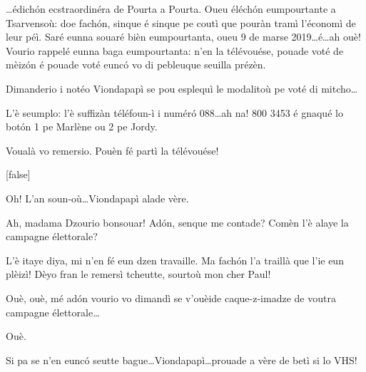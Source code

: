 \begin{drama}

\Brunospeaks \ldots édich\'on ecstraordinéra de Pourta a Pourta. Oueu éléch\'on eumpourtante a  Tsarvensoù: doe fach\'on, sinque é sinque pe coutì que pouràn tramì l'économì de leur péì. Saré eunna souaré bièn eumpourtanta, oueu 9 de marse 2019\ldots é\ldots ah ouè! Vourio rappelé eunna baga eumpourtanta: n'en la télévouése, pouade voté de mèiz\'on é pouade voté eunc\'o vo di pebleuque seuilla prézèn.


\Brunospeaks {} Dimanderio i notéo Viondapapì se pou esplequì le modalitoù pe voté di mitcho\ldots

\Noteospeaks L'è seumplo: l'è suffizàn téléfoun-ì i num\'er\'o 088\ldots ah na! 800 3453 é gnaqué lo bot\'on 1 pe Marlène ou 2 pe Jordy.
 
\Brunospeaks Voualà vo remersio. Pouèn fé partì la télévouése!


[false]

\Brunospeaks {} Oh! L'an soun-où\ldots Viondapapì alade vère. 


\Brunospeaks Ah, madama Dzourio bonsouar! Ad\'on, senque me contade? Comèn l'è alaye la campagne élettorale? 

\Presidanspeaks L'è itaye diya, mi n'en fé eun dzen travaille. Ma fach\'on l'a traillà que l'ie eun plèizì!
Dèyo fran le remersì tcheutte, sourtoù mon cher Paul!

\Brunospeaks Ouè, ouè, mé ad\'on vourio vo dimandì se v'ouèide caque-z-imadze de voutra campagne élettorale\ldots

\Presidanspeaks Ouè.


\Brunospeaks {} Si pa se n'en eunc\'o seutte bague\ldots Viondapapì\ldots prouade a vère de betì si lo VHS!


\end{drama}
